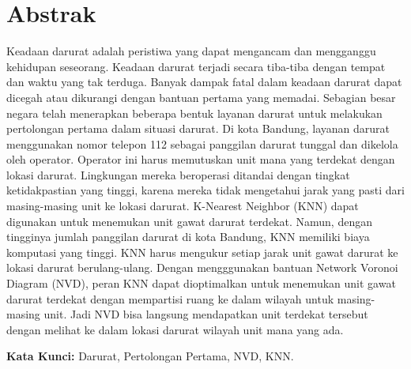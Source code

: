 \chapter*{Abstrak}

Keadaan darurat adalah peristiwa yang dapat mengancam dan mengganggu kehidupan seseorang. Keadaan darurat terjadi secara tiba-tiba dengan tempat dan waktu yang tak terduga. Banyak dampak fatal dalam keadaan darurat dapat dicegah atau dikurangi dengan bantuan pertama yang memadai. Sebagian besar negara telah menerapkan beberapa bentuk layanan darurat untuk melakukan pertolongan pertama dalam situasi darurat. Di kota Bandung, layanan darurat menggunakan nomor telepon 112 sebagai panggilan darurat tunggal dan dikelola oleh operator. Operator ini harus memutuskan unit mana yang terdekat dengan lokasi darurat. Lingkungan mereka beroperasi ditandai dengan tingkat ketidakpastian yang tinggi, karena mereka tidak mengetahui jarak yang pasti dari masing-masing unit ke lokasi darurat. K-Nearest Neighbor (KNN) dapat digunakan untuk menemukan unit gawat darurat terdekat. Namun, dengan tingginya jumlah panggilan darurat di kota Bandung, KNN memiliki biaya komputasi yang tinggi. KNN harus mengukur setiap jarak unit gawat darurat ke lokasi darurat berulang-ulang. Dengan mengggunakan bantuan Network Voronoi Diagram (NVD), peran KNN dapat dioptimalkan untuk menemukan unit gawat darurat terdekat dengan mempartisi ruang ke dalam wilayah untuk masing-masing unit. Jadi NVD bisa langsung mendapatkan unit terdekat tersebut dengan melihat ke dalam lokasi darurat wilayah unit mana yang ada.
  
\vspace{0.5 cm}
\begin{flushleft}
{\textbf{Kata Kunci:} Darurat, Pertolongan Pertama, NVD, KNN.}
\end{flushleft}